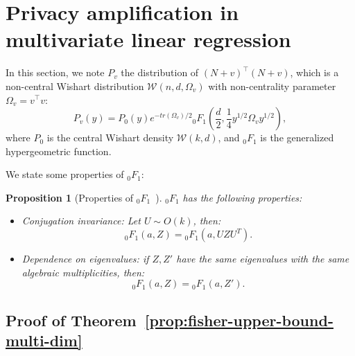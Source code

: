 \documentclass{article}
\theoremstyle{plain}
\newtheorem{proposition}{Proposition}[section]
\theoremstyle{definition}
\theoremstyle{remark}
\begin{document}
\newpage


\section{Privacy amplification in multivariate linear regression}
In this section, we note $P_v$ the distribution of $(N+v)^\top(N+v)$, which is a non-central Wishart distribution $\mathcal{W}(n,d,\Omega_v)$ with non-centrality parameter $\Omega_v = v^\top v$:
\[P_v(y) = P_0(y) e^{-tr(\Omega_v)/2} {}_0F_1\left(\frac{d}{2}, \frac{1}{4}y^{1/2} \Omega_v y^{1/2} \right),\]
where $P_0$ is the central Wishart density $\mathcal{W}(k,d)$, and ${}_0F_1$ is the generalized hypergeometric function.

We state some properties of ${}_0F_1$:

\begin{proposition}[Properties of ${}_0F_1$~\citep{Muirhead2009}]
${}_0F_1$ has the following properties:
    \begin{itemize}
        \item Conjugation invariance: Let $U \sim O(k)$, then: \[{}_0F_1(a,Z) = {}_0F_1(a, U Z U^T).\]
        \item Dependence on eigenvalues: if $Z,Z'$ have the same eigenvalues with the same algebraic multiplicities, then: \[{}_0F_1(a,Z) = {}_0F_1(a, Z').\]
    \end{itemize}
\end{proposition}

\subsection{Proof of Theorem~\ref{prop:fisher-upper-bound-multi-dim}}
\label{app:prop-fisher-upper-bound-multi-dim}

\propFisherUpperBoundMultiDim*
\end{document}
